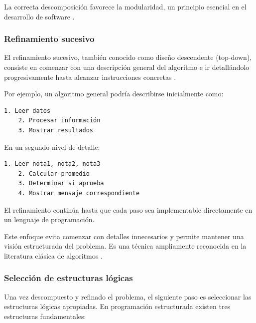 \documentclass[12pt,twoside]{book}
\begin{document}
						\noindent
						La correcta descomposición favorece la modularidad, un principio esencial en el desarrollo de software \cite{SWEBOK2025Guide}.
					
					\subsubsection{Refinamiento sucesivo}
						
						El refinamiento sucesivo, también conocido como diseño descendente (top-down), consiste en comenzar con una descripción general del algoritmo e ir detallándolo progresivamente hasta alcanzar instrucciones concretas \cite{Wirth1976Algorithms}.
						
						Por ejemplo, un algoritmo general podría describirse inicialmente como:
						
						\begin{lstlisting}[style=upsamStyle, caption={Descripción inicial del algoritmo mediante refinamiento sucesivo.},label={lst:RefinamientoInicial},basicstyle=\small\ttfamily]
	1. Leer datos
	2. Procesar información
	3. Mostrar resultados \end{lstlisting}
						
						En un segundo nivel de detalle:
						
						\begin{lstlisting}[style=upsamStyle, caption={Segundo nivel de refinamiento.},
							label={lst:RefinamientoSegundo}, basicstyle=\small\ttfamily]
	1. Leer nota1, nota2, nota3
	2. Calcular promedio
	3. Determinar si aprueba
	4. Mostrar mensaje correspondiente \end{lstlisting}
						
						El refinamiento continúa hasta que cada paso sea implementable directamente en un lenguaje de programación.
						
						Este enfoque evita comenzar con detalles innecesarios y permite mantener una visión estructurada del problema. Es una técnica ampliamente reconocida en la literatura clásica de algoritmos \cite{Knuth1997Art}.
					
					\subsubsection{Selección de estructuras lógicas}
						\noindent
						Una vez descompuesto y refinado el problema, el siguiente paso es seleccionar las estructuras lógicas apropiadas. En programación estructurada existen tres estructuras fundamentales:
						
\end{document}
